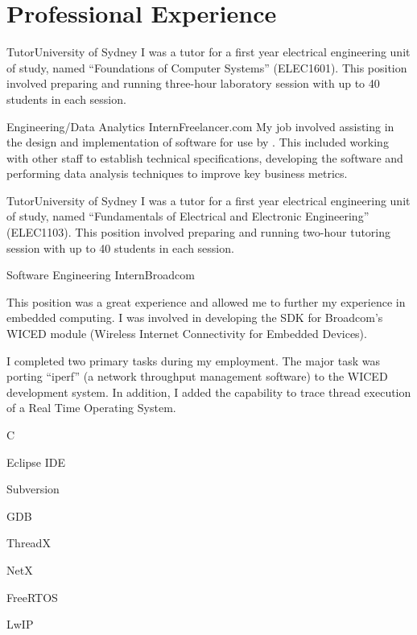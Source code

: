 \documentclass[10pt]{article}
\begin{document}
\section*{Professional Experience}
\begin{professionalExperience}

{Tutor}{University of Sydney}
{I was a tutor for a first year electrical engineering unit of study, named 
``Foundations of Computer Systems'' (ELEC1601). This position involved preparing
and running three-hour laboratory session with up to 40 students in each 
session.}
{}

{Engineering/Data Analytics Intern}{Freelancer.com}
{My job involved assisting in the design and implementation of software for use
by . This included working with other staff to establish
technical specifications, developing the software and performing data analysis 
techniques to improve key business metrics.}
{}

{Tutor}{University of Sydney}
{I was a tutor for a first year electrical engineering unit of study, named 
``Fundamentals of Electrical and Electronic Engineering'' (ELEC1103). This 
position involved preparing and running two-hour tutoring session with up to 40 
students in each session.}
{}

{Software Engineering Intern}{Broadcom}
{This position was a great experience and allowed me to further my experience in
embedded computing. I was involved in developing the SDK for Broadcom's WICED 
module (Wireless Internet Connectivity for Embedded Devices).

I completed two primary tasks during my employment. The major task was porting 
``iperf'' (a network throughput management software) to the WICED development 
system. In addition, I added the capability to trace thread execution of a Real 
Time Operating System.}
{\item C
\item Eclipse IDE
\item Subversion
\item GDB
\item ThreadX
\item NetX
\item FreeRTOS
\item LwIP}


\end{professionalExperience}
\end{document}
